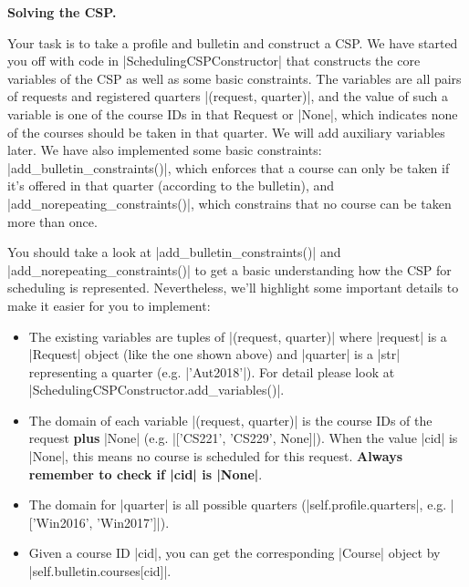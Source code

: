 {\bf Solving the CSP.}

Your task is to take a profile and bulletin and construct a CSP. We have started
you off with code in |SchedulingCSPConstructor| that constructs the core
variables of the CSP as well as some basic constraints. The variables are all
pairs of requests and registered quarters |(request, quarter)|, and the value of
such a variable is one of the course IDs in that Request or |None|, which
indicates none of the courses should be taken in that quarter. We will add
auxiliary variables later. We have also implemented some basic constraints:
|add_bulletin_constraints()|, which enforces that a course can only be taken if
it's offered in that quarter (according to the bulletin), and
|add_norepeating_constraints()|, which constrains that no course can be taken
more than once.

You should take a look at |add_bulletin_constraints()| and 
|add_norepeating_constraints()| to get a basic understanding how the CSP for
scheduling is represented. Nevertheless, we'll highlight some important details
to make it easier for you to implement:



\begin{itemize}
  \item The existing variables are tuples of |(request, quarter)| where
  |request| is a |Request| object (like the one shown above) and |quarter| is a
  |str| representing a quarter (e.g. |'Aut2018'|). For detail please look at
  |SchedulingCSPConstructor.add_variables()|.
  
  \item The domain of each variable |(request, quarter)| is the course IDs of
  the request {\bf plus} |None| (e.g. |['CS221', 'CS229', None]|). When the
  value |cid| is |None|, this means no course is scheduled for this request.
  {\bf Always remember to check if |cid| is |None|}.
  
  \item The domain for |quarter| is all possible quarters
  (|self.profile.quarters|, e.g. |['Win2016', 'Win2017']|).
  
  \item Given a course ID |cid|, you can get the corresponding |Course| object
  by |self.bulletin.courses[cid]|.
\end{itemize}

\begin{enumerate}

  

  

  

\end{enumerate}

